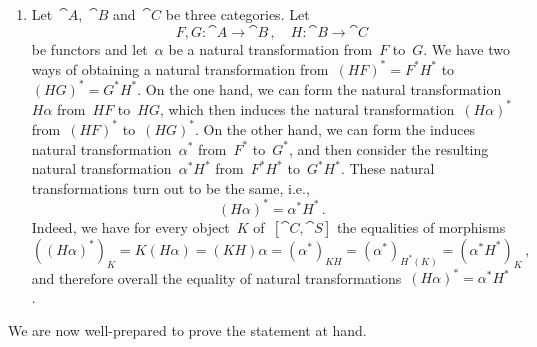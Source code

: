 \begin{enumerate}
\begin{itemize}
	\end{itemize}

	\item
		Let~$\cat{A}$,~$\cat{B}$ and~$\cat{C}$ be three categories.
		Let
		\[
			F, G \colon \cat{A} \to \cat{B} \,,
			\quad
			H \colon \cat{B} \to \cat{C}
		\]
		be functors and let~$α$ be a natural transformation from~$F$ to~$G$.
		We have two ways of obtaining a natural transformation from~$(H F)^* = F^* H^*$ to~$(H G)^* = G^* H^*$.
		On the one hand, we can form the natural transformation~$H α$ from~$H F$ to~$H G$, which then induces the natural transformation~$(H α)^*$ from~$(H F)^*$ to~$(H G)^*$.
		On the other hand, we can form the induces natural transformation~$α^*$ from~$F^*$ to~$G^*$, and then consider the resulting natural transformation~$α^* H^*$ from~$F^* H^*$ to~$G^* H^*$.
		These natural transformations turn out to be the same, i.e.,
		\[
			(H α)^* = α^* H^* \,.
		\]
		Indeed, we have for every object~$K$ of~$[\cat{C}, \cat{S}]$ the equalities of morphisms
		\[
			( (H α)^* )_K
			=
			K (H α)
			=
			(K H) α
			=
			(α^*)_{K H}
			=
			(α^*)_{H^*(K)}
			=
			(α^* H^*)_K \,,
		\]
		and therefore overall the equality of natural transformations~$(H α)^* = α^* H^*$.
\end{enumerate}

We are now well-prepared to prove the statement at hand.

